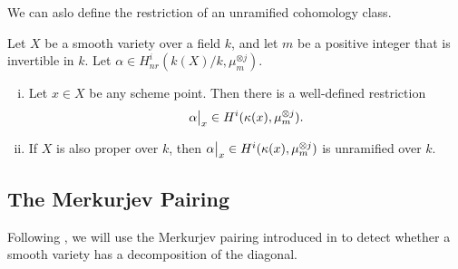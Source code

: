 
We can aslo define the restriction of an unramified cohomology class.

\begin{proposition}{{\cite[Proposition 4.8]{SchreiederCyclesAndRationality}}}
	\label{prop:UnramifiedRestriction}
  Let $X$ be a smooth variety over a field $k$, and let $m$ be a positive integer that is invertible in $k$. Let $\alpha \in H_{nr}^i(k(X)/k, \mu_m^{\otimes j})$.
  \begin{enumerate}[i)]
  \item
   Let $x \in X$ be any scheme point. Then there is a well-defined restriction
    \[\restr{\alpha}{x} \in H^i(\kappa(x),\mu_m^{\otimes j}). \]
  \item
    If $X$ is also proper over $k$, then $\restr{\alpha}{x} \in H^i(\kappa(x),\mu_m^{\otimes j})$ is unramified over $k$.
  \end{enumerate}
\end{proposition}


\subsection{The Merkurjev Pairing}
Following \cite{SchreiederHypersurface}, we will use the Merkurjev pairing introduced in \cite[Section 2.4]{Mer08} to detect whether a smooth variety has a decomposition of the diagonal.

